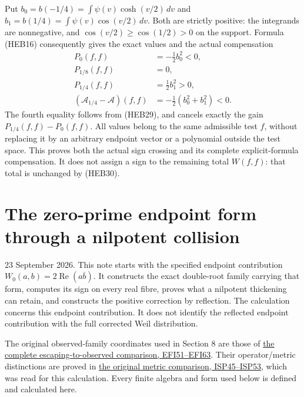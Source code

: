\documentclass[
  10pt,
  a4paper,
]{article}
\begin{document}
Put \(b_0=b(-1/4)=\int\psi(v)\cosh(v/2)\,dv\) and
\(b_1=b(1/4)=\int\psi(v)\cos(v/2)\,dv\). Both are strictly positive: the
integrands are nonnegative, and \(\cos(v/2)\ge\cos(1/2)>0\) on the
support. Formula (HEB16) consequently gives the exact values and the
actual compensation \[
\begin{aligned}
P_0(f,f)&=-\tfrac12 b_0^2<0,\\
P_{1/8}(f,f)&=0,\\
P_{1/4}(f,f)&=\tfrac12 b_1^2>0,\\
(\mathcal A_{1/4}-\mathcal A)(f,f)
&=-\tfrac12(b_0^2+b_1^2)<0.
\end{aligned}
\tag{HEB36}
\] The fourth equality follows from (HEB29), and cancels exactly the
gain \(P_{1/4}(f,f)-P_0(f,f)\). All values belong to the same admissible
test \(f\), without replacing it by an arbitrary endpoint vector or a
polynomial outside the test space. This proves both the actual sign
crossing and its complete explicit-formula compensation. It does not
assign a sign to the remaining total \(W(f,f)\): that total is unchanged
by (HEB30).

\clearpage

\section{The zero-prime endpoint form through a nilpotent
collision}\label{the-zero-prime-endpoint-form-through-a-nilpotent-collision}

23 September 2026. This note starts with the specified endpoint
contribution \(W_0(a,b)=2\operatorname{Re}(a\overline b)\). It
constructs the exact double-root family carrying that form, computes its
sign on every real fibre, proves what a nilpotent thickening can retain,
and constructs the positive correction by reflection. The calculation
concerns this endpoint contribution. It does not identify the reflected
endpoint contribution with the full corrected Weil distribution.

The original observed-family coordinates used in Section 8 are those of
\href{https://github.com/KokunoYumeto/zeta-function-research-reader/blob/173dbc6ed5a03235dbe7654f928f3692107db39b/workbenches/splitzero-tandem/branches/tau-zero-prime-positivity/ESCAPING_FIBRE_INFINITESIMAL_DERIVATION.md}{the
complete escaping-to-observed comparison, EFI51--EFI63}. Their
operator/metric distinctions are proved in
\href{https://github.com/KokunoYumeto/zeta-function-research-reader/blob/173dbc6ed5a03235dbe7654f928f3692107db39b/workbenches/splitzero-tandem/branches/tau-zero-prime-positivity/INFINITESIMAL_SUPPORT_POSITIVITY_DERIVATION.md}{the
original metric comparison, ISP45--ISP53}, which was read for this
calculation. Every finite algebra and form used below is defined and
calculated here.
\end{document}
